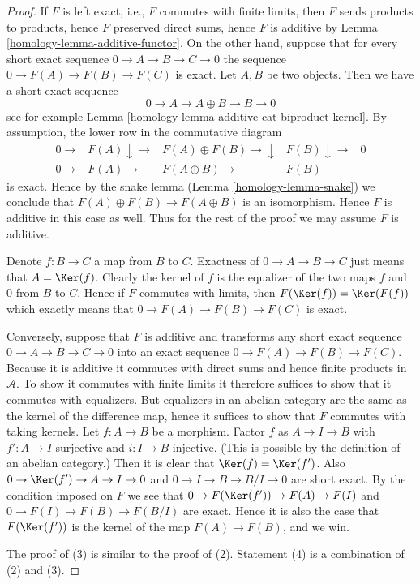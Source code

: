 \begin{proof}

If $F$ is left exact, i.e., $F$ commutes with finite limits, then
$F$ sends products to products, hence $F$ preserved direct sums,
hence $F$ is additive by Lemma \ref{homology-lemma-additive-functor}.
On the other hand, suppose that for every short exact sequence
$0 \to A \to B \to C \to 0$ the sequence $0 \to F(A) \to F(B) \to F(C)$
is exact. Let $A, B$ be two objects. Then we have a short
exact sequence
$$
0 \to A \to A \oplus B \to B \to 0
$$
see for example Lemma \ref{homology-lemma-additive-cat-biproduct-kernel}.
By assumption, the lower row in the commutative diagram
$$
\begin{array}{ccccc}0 \longrightarrow & F(A) \downarrow\longrightarrow & F(A) \oplus F(B) \longrightarrow\downarrow & F(B) \downarrow\longrightarrow & 0 \\ 0 \longrightarrow & F(A) \longrightarrow & F(A \oplus B) \longrightarrow & F(B) & \end{array}
$$
is exact. Hence by the snake lemma (Lemma \ref{homology-lemma-snake})
we conclude that $F(A) \oplus F(B) \to F(A \oplus B)$ is an
isomorphism. Hence $F$ is additive in this case as well.
Thus for the rest of the proof we may assume $F$ is additive.

\medskip\noindent
Denote $f : B \to C$ a map from $B$ to $C$.
Exactness of $0 \to A \to B \to C$ just means that
$A = \Ker(f)$. Clearly the kernel of $f$ is
the equalizer of the two maps $f$ and $0$ from $B$ to $C$.
Hence if $F$ commutes with limits, then $F(\Ker(f))
= \Ker(F(f))$ which exactly means that
$0 \to F(A) \to F(B) \to F(C)$ is exact.

\medskip\noindent
Conversely, suppose that $F$ is additive and
transforms any short exact sequence $0 \to A \to B \to C \to 0$ into
an exact sequence $0 \to F(A) \to F(B) \to F(C)$.
Because it is additive it commutes with direct sums
and hence finite products in $\mathcal{A}$. To show
it commutes with finite limits it therefore
suffices to show that it commutes with
equalizers. But equalizers in an abelian category
are the same as the kernel of the difference map,
hence it suffices to show that $F$ commutes with
taking kernels. Let $f : A \to B$ be a morphism.
Factor $f$ as $A \to I \to B$ with $f' : A \to I$ surjective
and $i : I \to B$ injective. (This is possible by the
definition of an abelian category.) Then it is
clear that $\Ker(f) = \Ker(f')$. Also
$0 \to \Ker(f') \to A \to I \to 0$
and
$0 \to I \to B \to B/I \to 0$
are short exact. By the condition imposed on $F$
we see that
$0 \to F(\Ker(f')) \to F(A) \to F(I)$
and
$0 \to F(I) \to F(B) \to F(B/I)$
are exact. Hence it is also the case that
$F(\Ker(f'))$ is the kernel of the map
$F(A) \to F(B)$, and we win.

\medskip\noindent
The proof of (3) is similar to the proof of (2).
Statement (4) is a combination of (2) and (3).
\end{proof}

